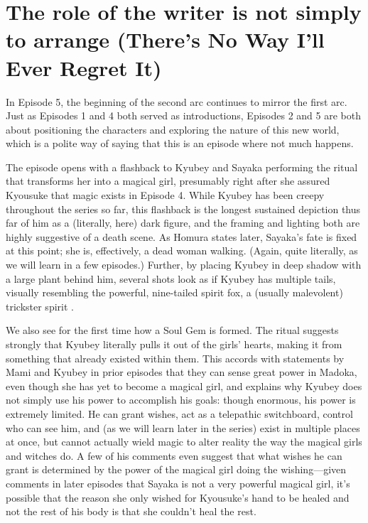 \chapter{The role of the writer is not simply to arrange (There's No Way I'll Ever Regret It)}
In Episode 5, the beginning of the second arc continues to mirror the first arc. Just as Episodes 1 and 4 both served as introductions, Episodes 2 and 5 are both about positioning the characters and exploring the nature of this new world, which is a polite way of saying that this is an episode where not much happens.

The episode opens with a flashback to Kyubey and Sayaka performing the ritual that transforms her into a magical girl, presumably right after she assured Kyousuke that magic exists in Episode 4. While Kyubey has been creepy throughout the series so far, this flashback is the longest sustained depiction thus far of him as a (literally, here) dark figure, and the framing and lighting both are highly suggestive of a death scene. As Homura states later, Sayaka's fate is fixed at this point; she is, effectively, a dead woman walking. (Again, quite literally, as we will learn in a few episodes.) Further, by placing Kyubey in deep shadow with a large plant behind him, several shots look as if Kyubey has multiple tails, visually resembling the powerful, nine-tailed spirit fox, a (usually malevolent) trickster spirit \cite{ref40}. 

We also see for the first time how a Soul Gem is formed. The ritual suggests strongly that Kyubey literally pulls it out of the girls' hearts, making it from something that already existed within them. This accords with statements by Mami and Kyubey in prior episodes that they can sense great power in Madoka, even though she has yet to become a magical girl, and explains why Kyubey does not simply use his power to accomplish his goals: though enormous, his power is extremely limited. He can grant wishes, act as a telepathic switchboard, control who can see him, and (as we will learn later in the series) exist in multiple places at once, but cannot actually wield magic to alter reality the way the magical girls and witches do. A few of his comments even suggest that what wishes he can grant is determined by the power of the magical girl doing the wishing—given comments in later episodes that Sayaka is not a very powerful magical girl, it's possible that the reason she only wished for Kyousuke's hand to be healed and not the rest of his body is that she couldn't heal the rest.

